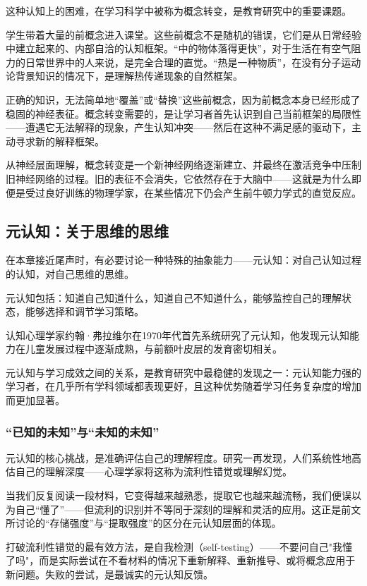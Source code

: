 \documentclass[11pt]{article}
\begin{document}
这种认知上的困难，在学习科学中被称为概念转变，是教育研究中的重要课题。

学生带着大量的前概念进入课堂。这些前概念不是随机的错误，它们是从日常经验中建立起来的、内部自洽的认知框架。“中的物体落得更快”，对于生活在有空气阻力的日常世界中的人来说，是完全合理的直觉。“热是一种物质”，在没有分子运动论背景知识的情况下，是理解热传递现象的自然框架。

正确的知识，无法简单地“覆盖”或“替换”这些前概念，因为前概念本身已经形成了稳固的神经表征。概念转变需要的，是让学习者首先认识到自己当前框架的局限性——遭遇它无法解释的现象，产生认知冲突——然后在这种不满足感的驱动下，主动寻求新的解释框架。

从神经层面理解，概念转变是一个新神经网络逐渐建立、并最终在激活竞争中压制旧神经网络的过程。旧的表征不会消失，它依然存在于大脑中——这就是为什么即便是受过良好训练的物理学家，在某些情况下仍会产生前牛顿力学式的直觉反应。
\subsection{元认知：关于思维的思维}
\label{sec:org98f15e3}

在本章接近尾声时，有必要讨论一种特殊的抽象能力——元认知：对自己认知过程的认知，对自己思维的思维。

元认知包括：知道自己知道什么，知道自己不知道什么，能够监控自己的理解状态，能够选择和调节学习策略。

认知心理学家约翰·弗拉维尔在1970年代首先系统研究了元认知，他发现元认知能力在儿童发展过程中逐渐成熟，与前额叶皮层的发育密切相关。

元认知与学习成效之间的关系，是教育研究中最稳健的发现之一：元认知能力强的学习者，在几乎所有学科领域都表现更好，且这种优势随着学习任务复杂度的增加而更加显著。
\subsubsection{“已知的未知”与“未知的未知”}
\label{sec:org09d1c5f}

元认知的核心挑战，是准确评估自己的理解程度。研究一再发现，人们系统性地高估自己的理解深度——心理学家将这称为流利性错觉或理解幻觉。

当我们反复阅读一段材料，它变得越来越熟悉，提取它也越来越流畅，我们便误以为自己“懂了”——但流利的识别并不等同于深刻的理解和灵活的应用。这正是前文所讨论的“存储强度”与“提取强度”的区分在元认知层面的体现。

打破流利性错觉的最有效方法，是自我检测（self-testing）——不要问自己"我懂了吗"，而是实际尝试在不看材料的情况下重新解释、重新推导、或将概念应用于新问题。失败的尝试，是最诚实的元认知反馈。
\end{document}
